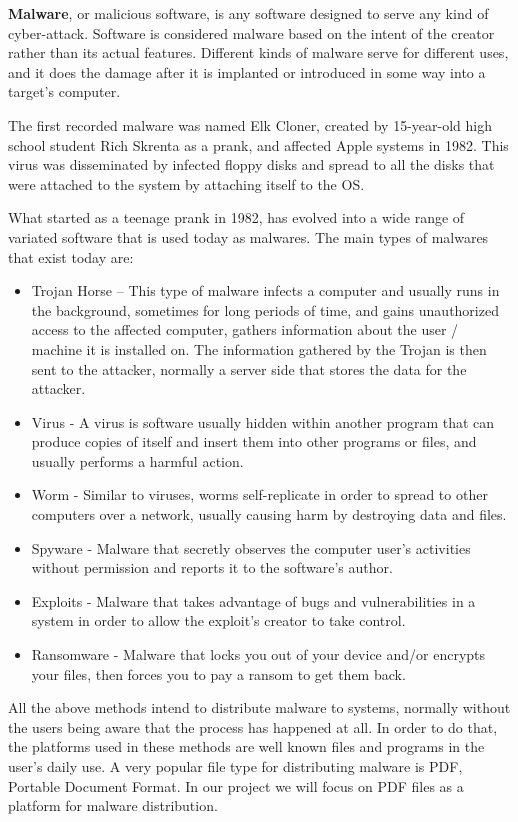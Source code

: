 \documentclass{article}
\begin{document}
\indent \textbf{Malware}, or malicious software, is any software designed to serve any kind of cyber-attack. Software is considered malware based on the intent of the creator rather than its actual features. Different kinds of malware serve for different uses, and it does the damage after it is implanted or introduced in some way into a target’s computer. 

\indent The first recorded malware was named Elk Cloner, created by 15-year-old high school student Rich Skrenta as a prank, and affected Apple  systems in 1982. This virus was disseminated by infected floppy disks and spread to all the disks that were attached to the system by attaching itself to the OS.

\indent What started as a teenage prank in 1982, has evolved into a wide range of variated software that is used today as malwares. The main types of malwares that exist today are: 
\begin{itemize}
  \item Trojan Horse – This type of malware infects a computer and usually runs in the background, sometimes for long periods of time, and gains unauthorized access to the affected computer, gathers information about the user / machine it is installed on. The information gathered by the Trojan is then sent to the attacker, normally a server side that stores the data for the attacker.
  \item Virus - A virus is software usually hidden within another program that can produce copies of itself and insert them into other programs or files, and usually performs a harmful action.
  \item Worm -  Similar to viruses, worms self-replicate in order to spread to other computers over a network, usually causing harm by destroying data and files.
  \item Spyware - Malware that secretly observes the computer user’s activities without permission and reports it to the software’s author.
  \item Exploits - Malware that takes advantage of bugs and vulnerabilities in a system in order to allow the exploit’s creator to take control.
  \item Ransomware - Malware that locks you out of your device and/or encrypts your files, then forces you to pay a ransom to get them back.
\end{itemize}

\indent All the above methods intend to distribute malware to systems, normally without the users being aware that the process has happened at all. In order to do that, the platforms used in these methods are well known files and programs in the user’s daily use. A very popular file type for distributing malware is PDF, Portable Document Format. In our project we will focus on PDF files as a platform for malware distribution.
\end{document}
